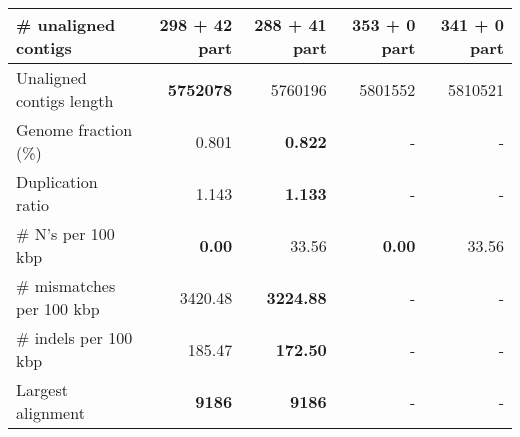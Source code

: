 \documentclass[12pt,a4paper]{article}
\begin{document}
\begin{table}[ht]
\begin{center}
\begin{tabular}{|l*{4}{|r}|}
\# unaligned contigs & 298 + 42 part & {\bf 288 + 41 part} & 353 + 0 part & 341 + 0 part \\ \hline
Unaligned contigs length & {\bf 5752078} & 5760196 & 5801552 & 5810521 \\ \hline
Genome fraction (\%) & 0.801 & {\bf 0.822} & - & - \\ \hline
Duplication ratio & 1.143 & {\bf 1.133} & - & - \\ \hline
\# N's per 100 kbp & {\bf 0.00} & 33.56 & {\bf 0.00} & 33.56 \\ \hline
\# mismatches per 100 kbp & 3420.48 & {\bf 3224.88} & - & - \\ \hline
\# indels per 100 kbp & 185.47 & {\bf 172.50} & - & - \\ \hline
Largest alignment & {\bf 9186} & {\bf 9186} & - & - \\ \hline
\end{tabular}
\end{center}
\end{table}
\end{document}
